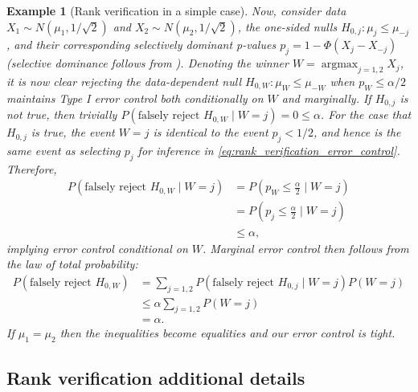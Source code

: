 \documentclass{article}
\DeclareMathOperator*{\argmax}{argmax}
\newtheorem{example}{Example}
\begin{document}
\begin{appendix}
\begin{example}[Rank verification in a simple case]
    Now, consider data $X_1 \sim N(\mu_1, 1/\sqrt{2})$ and $X_2 \sim N(\mu_2, 1/\sqrt{2})$, the one-sided nulls $H_{0, j}: \mu_j \leq \mu_{-j}$, and their corresponding selectively dominant p-values $p_j = 1 - \Phi(X_j - X_{-j})$ (selective dominance follows from ). Denoting the winner $W = \argmax_{j = 1, 2} X_j$, it is now clear rejecting the data-dependent null $H_{0, W}: \mu_W \leq \mu_{-W}$ when $p_{W} \leq \alpha/2$ maintains Type I error control both conditionally on $W$ and marginally. If $H_{0, j}$ is not true, then trivially $P(\text{falsely reject } H_{0, W} \mid W = j) = 0 \leq \alpha$. For the case that $H_{0, j}$ is true, the event $W=j$ is identical to the event $p_j < 1/2$, and hence is the same event as selecting $p_j$ for inference in \eqref{eq:rank_verification_error_control}. Therefore, 
    \begin{align*}
        P(\text{falsely reject } H_{0, W} \mid W = j) &= P\left(p_W \leq \frac{\alpha}{2}  \mid W = j\right)\\
        &= P\left(p_j \leq \frac{\alpha}{2}  \mid W = j \right) \\
        &\leq \alpha,
    \end{align*}
    implying error control conditional on $W$. Marginal error control then follows from the law of total probability:
    \begin{align*}
        P(\text{falsely reject } H_{0, W}) &= \sum_{j=1, 2} P(\text{falsely reject } H_{0, j} \mid W = j)P(W=j) \\
                                          &\leq \alpha \sum_{j = 1, 2} P(W=j)\\
                                          &=\alpha. 
    \end{align*}
    If $\mu_1 = \mu_2$ then the inequalities become equalities and our error control is tight. 
    \end{example}

\subsection{Rank verification additional details}
\label{sec:rank_verification_appdx}


\end{appendix}
\end{document}
